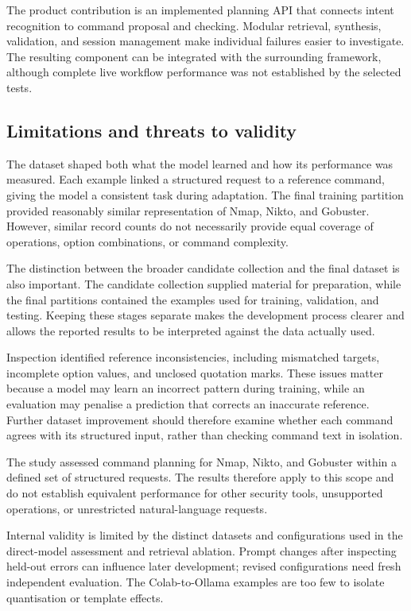 \documentclass[
]{article}
\begin{document}
The product contribution is an implemented planning API that connects
intent recognition to command proposal and checking. Modular retrieval,
synthesis, validation, and session management make individual failures
easier to investigate. The resulting component can be integrated with
the surrounding framework, although complete live workflow performance
was not established by the selected tests.

\hypertarget{limitations-and-threats-to-validity}{%
\subsection{Limitations and threats to
validity}\label{limitations-and-threats-to-validity}}

The dataset shaped both what the model learned and how its performance
was measured. Each example linked a structured request to a reference
command, giving the model a consistent task during adaptation. The final
training partition provided reasonably similar representation of Nmap,
Nikto, and Gobuster. However, similar record counts do not necessarily
provide equal coverage of operations, option combinations, or command
complexity.

The distinction between the broader candidate collection and the final
dataset is also important. The candidate collection supplied material
for preparation, while the final partitions contained the examples used
for training, validation, and testing. Keeping these stages separate
makes the development process clearer and allows the reported results to
be interpreted against the data actually used.

Inspection identified reference inconsistencies, including mismatched
targets, incomplete option values, and unclosed quotation marks. These
issues matter because a model may learn an incorrect pattern during
training, while an evaluation may penalise a prediction that corrects an
inaccurate reference. Further dataset improvement should therefore
examine whether each command agrees with its structured input, rather
than checking command text in isolation.

The study assessed command planning for Nmap, Nikto, and Gobuster within
a defined set of structured requests. The results therefore apply to
this scope and do not establish equivalent performance for other
security tools, unsupported operations, or unrestricted natural-language
requests.

Internal validity is limited by the distinct datasets and configurations
used in the direct-model assessment and retrieval ablation. Prompt
changes after inspecting held-out errors can influence later
development; revised configurations need fresh independent evaluation.
The Colab-to-Ollama examples are too few to isolate quantisation or
template effects.
\end{document}

